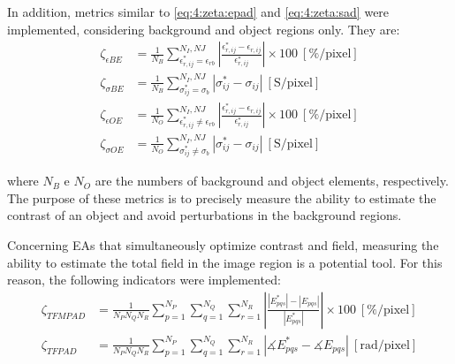 			In addition, metrics similar to \eqref{eq:4:zeta:epad} and \eqref{eq:4:zeta:sad} were implemented, considering background and object regions only. They are:
			\begin{align}
				\zeta_{\epsilon BE} &= \frac{1}{N_B}\sum\limits_{\epsilon^*_{r,ij}=\epsilon_{rb}}^{N_I,NJ}\left|\frac{\epsilon^*_{r,ij}-\epsilon_{r,ij}}{\epsilon^*_{r,ij}}\right|\times100~[\%/\mathrm{pixel}] \label{eq:4:zeta:ebe} \\
				\zeta_{\sigma BE} &= \frac{1}{N_B}\sum\limits_{\sigma^*_{ij}=\sigma_{b}}^{N_I,NJ}\left|\sigma^*_{ij}-\sigma_{ij}\right|~[\mathrm{S}/\mathrm{pixel}] \label{eq:4:zeta:sbe} \\
				\zeta_{\epsilon OE} &= \frac{1}{N_O}\sum\limits_{\epsilon^*_{r,ij}\neq\epsilon_{rb}}^{N_I,NJ}\left|\frac{\epsilon^*_{r,ij}-\epsilon_{r,ij}}{\epsilon^*_{r,ij}}\right|\times100~[\%/\mathrm{pixel}] \label{eq:4:zeta:eoe} \\
				\zeta_{\sigma OE} &= \frac{1}{N_O}\sum\limits_{\sigma^*_{ij}\neq\sigma_{b}}^{N_I,NJ}\left|\sigma^*_{ij}-\sigma_{ij}\right|~[\mathrm{S}/\mathrm{pixel}] \label{eq:4:zeta:soe}
			\end{align}
			
			\noindent where $N_B$ e $N_O$ are the numbers of background and object elements, respectively. The purpose of these metrics is to precisely measure the ability to estimate the contrast of an object and avoid perturbations in the background regions.
			
			Concerning EAs that simultaneously optimize contrast and field, measuring the ability to estimate the total field in the image region is a potential tool. For this reason, the following indicators were implemented:
			\begin{align}
				\zeta_{TFMPAD} &= \frac{1}{N_PN_QN_R}\sum\limits_{p=1}^{N_P}\sum\limits_{q=1}^{N_Q}\sum\limits_{r=1}^{N_R}\left|\frac{|E^*_{pqs}|-|E_{pqs}|}{|E^*_{pqs}|}\right|\times100~[\%/\mathrm{pixel}] \label{eq:4:zeta:tfmpad} \\
				\zeta_{TFPAD} &= \frac{1}{N_PN_QN_R}\sum\limits_{p=1}^{N_P}\sum\limits_{q=1}^{N_Q}\sum\limits_{r=1}^{N_R}\left|\measuredangle E^*_{pqs} - \measuredangle E_{pqs}\right| ~[\mathrm{rad}/\mathrm{pixel}] \label{eq:4:zeta:tfpad}
			\end{align}
			
